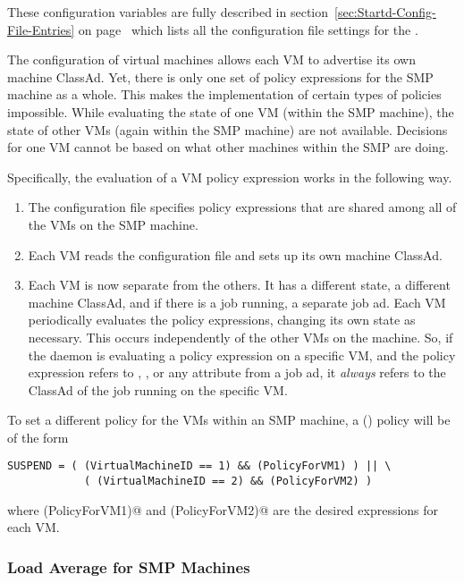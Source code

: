 These configuration variables are fully described in
section~\ref{sec:Startd-Config-File-Entries} on
page~\pageref{sec:Startd-Config-File-Entries} which lists all the
configuration file settings for the .

The configuration of virtual machines allows each VM to advertise
its own machine ClassAd.
Yet, there is only one set of policy expressions for the SMP
machine as a whole.
This makes the implementation of certain types of policies impossible.
While evaluating the state of one VM (within the SMP machine),
the state of other VMs (again within the SMP machine) are not
available.
Decisions for one VM cannot be based on what other machines within the SMP
are doing.

Specifically, the evaluation of a VM policy expression works in
the following way.
\begin{enumerate}
\item 
The configuration file specifies policy expressions that are shared among
all of the VMs on the SMP machine.
\item 
Each VM reads the configuration file and sets up its own machine ClassAd.
\item 
Each VM is now separate from the others.  It has a
different state, a different machine ClassAd, and if there is a job
running, a separate job ad.
Each VM periodically
evaluates the policy expressions, changing its own state
as necessary.
This occurs independently of the other VMs on the machine.
So, if the  daemon is evaluating a policy expression
on a specific VM,
and the policy expression refers to , ,
or any attribute from a job ad,
it \emph{always} refers to the ClassAd of the
job running on the specific VM.
\end{enumerate}

To set a different policy for the VMs within an SMP machine,
a (\verb@SUSPEND@) policy will be of the form
\begin{verbatim}
SUSPEND = ( (VirtualMachineID == 1) && (PolicyForVM1) ) || \
            ( (VirtualMachineID == 2) && (PolicyForVM2) )
\end{verbatim}
where \verb@(PolicyForVM1)@ and \verb@(PolicyForVM2)@ are the
desired expressions for each VM.

\subsubsection{\label{sec:SMP-Load}
Load Average for SMP Machines}


